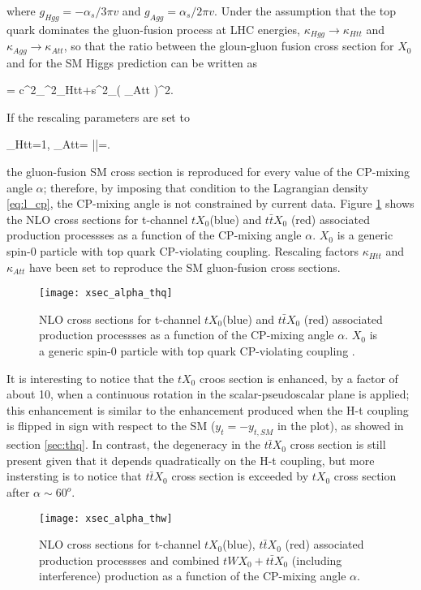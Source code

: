 \noindent where $g_{Hgg}=-\alpha_s/3\pi v$ and $g_{Agg}= \alpha_s/2\pi v$.  Under the assumption that the top quark dominates the gluon-fusion process at LHC energies, $\kappa_{Hgg} \to \kappa_{Htt}$ and  $\kappa_{Agg} \to \kappa_{Att}$, so that the ratio between the gloun-gluon fusion cross section for $X_0$ and for the SM Higgs prediction can be written as     

\beqn
{}=  c^2_\alpha\kappa^2_{Htt}+s^2_\alpha \left( \kappa_{Att} \right)^2.
\label{eq:GFrate}
\eeqn

\noindent If the rescaling parameters are set to

\beqn
\kappa_{Htt}=1, \qquad \kappa_{Att}= \left|\right|=.
\label{eq:GFrate}
\eeqn

\noindent the gluon-fusion SM cross section is reproduced for every value of the CP-mixing angle $\alpha$; therefore, by imposing that condition to the Lagrangian density \ref{eq:l_cp}, the CP-mixing angle is not constrained by current data. Figure \ref{xsec_alpha_thq} shows the NLO cross sections for t-channel $tX_0$(blue) and $t\bar{t}X_0$ (red) associated production processses as a function of the CP-mixing angle $\alpha$. $X_0$ is a generic spin-0 particle with top quark CP-violating coupling. Rescaling factors $\kappa_{Htt}$ and  $\kappa_{Att}$ have been set to reproduce the SM gluon-fusion cross sections.   

\begin{figure}[h!]
\centering
\texttt{[image: xsec\_alpha\_thq]}
\caption[NLO cross section for $tX_0$ and $t\bar{t}X_0$.]{NLO cross sections for t-channel $tX_0$(blue) and $t\bar{t}X_0$ (red) associated production processses as a function of the CP-mixing angle $\alpha$. $X_0$ is a generic spin-0 particle with top quark CP-violating coupling \cite{maltoni2}.} 
\label{xsec_alpha_thq}
\end{figure}

\noindent It is interesting to notice that the $tX_0$ croos section is enhanced, by a factor of about 10, when a continuous rotation in the scalar-pseudoscalar plane is applied; this enhancement is similar to the enhancement produced when the H-t coupling is flipped in sign with respect to the SM ($y_t=-y_{t,SM}$ in the plot), as showed in section \ref{sec:thq}. In contrast, the degeneracy in the $t\bar{t}X_0$ cross section is still present given that it depends quadratically on the H-t coupling, but more instersting is to notice that $t\bar{t}X_0$ cross section is exceeded by $tX_0$ cross section after $\alpha\sim 60^o$.
\begin{figure}[h!]
\centering
\texttt{[image: xsec\_alpha\_thw]}
\caption[NLO cross section for $tWX_0$, $t\bar{t}X_0$ and $tWX_0 + t\bar{t}X_0 + interference$.]{NLO cross sections for t-channel $tX_0$(blue), $t\bar{t}X_0$ (red) associated production processses and combined $tWX_0 + t\bar{t}X_0$ (including interference) production as a function of the CP-mixing angle $\alpha$\cite{maltoni2}.} 
\label{xsec_alpha_thw}
\end{figure}


